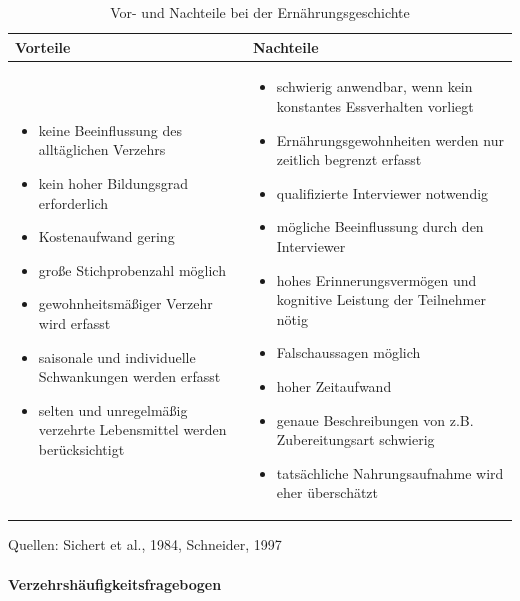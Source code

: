 \begin{table}[!h]
\begin{flushleft}
\caption{Vor- und Nachteile bei der Ernährungsgeschichte}
\end{flushleft}
\begin{tabular}{p{7cm} p{7cm}}
Vorteile & Nachteile \\
\hline

\begin{itemize}
\item keine Beeinflussung des alltäglichen Verzehrs
\item kein hoher Bildungsgrad erforderlich
\item Kostenaufwand gering
\item große Stichprobenzahl möglich
\item gewohnheitsmäßiger Verzehr wird erfasst 
\item saisonale und individuelle Schwankungen werden erfasst
\item selten und unregelmäßig verzehrte Lebensmittel werden berücksichtigt

\end{itemize}

&

\begin{itemize}
\item schwierig anwendbar, wenn kein konstantes Essverhalten vorliegt
\item Ernährungsgewohnheiten werden nur zeitlich begrenzt erfasst
\item qualifizierte Interviewer notwendig
\item mögliche Beeinflussung durch den Interviewer
\item hohes Erinnerungsvermögen und kognitive Leistung der Teilnehmer nötig
\item Falschaussagen möglich
\item hoher Zeitaufwand
\item genaue Beschreibungen von z.B. Zubereitungsart schwierig
\item tatsächliche Nahrungsaufnahme wird eher überschätzt

\end{itemize}
\end{tabular}
\label{tab:Ernährungsgeschichte}
Quellen: Sichert et al., 1984, Schneider, 1997
\end{table}



\paragraph{Verzehrshäufigkeitsfragebogen}

